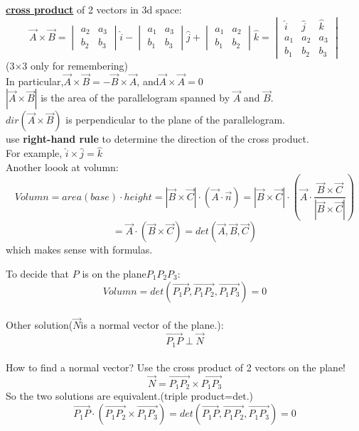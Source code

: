 \documentclass{article}
\begin{document}
\underline{\textbf{cross product}} of 2 vectors in 3d space:\\
\[
\overrightarrow{A}\times\overrightarrow{B}
=\begin{vmatrix}
a_2&a_3\\
b_2&b_3
\end{vmatrix}\hat{i}
-\begin{vmatrix}
a_1&a_3\\
b_1&b_3
\end{vmatrix}\hat{j}
+\begin{vmatrix}
a_1&a_2\\
b_1&b_2
\end{vmatrix}\hat{k}
=\begin{vmatrix}
\hat{i} & \hat{j} & \hat{k}\\
a_1 & a_2 & a_3\\
b_1 & b_2 & b_3
\end{vmatrix}
\](3×3 only for remembering)\\
In particular,$\overrightarrow{A}\times\overrightarrow{B}
=-\overrightarrow{B}\times\overrightarrow{A}$,
and$\overrightarrow{A}\times\overrightarrow{A}=0$\\
$\left|\overrightarrow{A}\times\overrightarrow{B}\right|$
is the area of the parallelogram spanned by $\overrightarrow{A}$ and $\overrightarrow{B}$.\\
$dir(\overrightarrow{A}\times\overrightarrow{B})$
is perpendicular to the plane of the parallelogram.\\
use \textbf{right-hand rule} to determine the direction of the cross product.\\
For example, $\hat{i}\times\hat{j}=\hat{k}$\\

Another loook at volumn:\\
\[Volumn=area(base)\cdot height=\left | \overrightarrow{B}\times\overrightarrow{C}  \right |\cdot(\overrightarrow{A}\cdot\vec{n})
=\left | \overrightarrow{B}\times\overrightarrow{C}  \right |\cdot(\overrightarrow{A}\cdot
\frac{\overrightarrow{B}\times\overrightarrow{C}}{\left | \overrightarrow{B}\times\overrightarrow{C}  \right |})
\]
\[=\overrightarrow{A}\cdot(\overrightarrow{B}\times\overrightarrow{C})
=det(\overrightarrow{A},\overrightarrow{B},\overrightarrow{C})\]
which makes sense with formulas.

To decide that $P$ is on the plane$P_1P_2P_3$:
\[Volumn=det(\overrightarrow{P_1P},\overrightarrow{P_1P_2},\overrightarrow{P_1P_3})=0\]
\\Other solution($\overrightarrow{N}$is a normal vector of the plane.):
\[\overrightarrow{P_1P}\perp\overrightarrow{N}\]\\
How to find a normal vector? Use the cross product of 2 vectors on the plane!\\
\[\overrightarrow{N}=\overrightarrow{P_1P_2}\times\overrightarrow{P_1P_3}\]
So the two solutions are equivalent.(triple product=det.)
\[\overrightarrow{P_1P}\cdot(\overrightarrow{P_1P_2}\times\overrightarrow{P_1P_3})
=det(\overrightarrow{P_1P},\overrightarrow{P_1P_2},\overrightarrow{P_1P_3})=0\]
\end{document}
